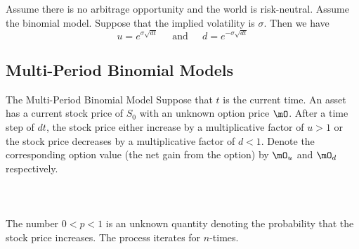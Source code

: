 \documentclass[a4paper]{article}
\begin{document}
\begin{lmm}{}{} Assume there is no arbitrage opportunity and the world is risk-neutral. Assume the binomial model. Suppose that the implied volatility is $\sigma$. Then we have $$u=e^{\sigma\sqrt{dt}}\;\;\;\;\text{ and }\;\;\;\;d=e^{-\sigma\sqrt{dt}}$$
\end{lmm}

\subsection{Multi-Period Binomial Models}
\begin{defn}{The Multi-Period Binomial Model}{} Suppose that $t$ is the current time. An asset has a current stock price of $S_0$ with an unknown option price $\mO$. After a time step of $dt$, the stock price either increase by a multiplicative factor of $u>1$ or the stock price decreases by a multiplicative factor of $d<1$. Denote the corresponding option value (the net gain from the option) by $\mO_u$ and $\mO_d$ respectively. \\~\\
 \\~\\
The number $0<p<1$ is an unknown quantity denoting the probability that the stock price increases. The process iterates for $n$-times. 
\end{defn}
\end{document}
